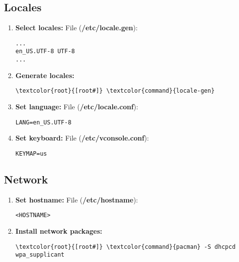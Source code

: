 \documentclass[10pt, a4paper, onecolumn, openany]{book} %
\begin{document}
\subsection{Locales}
    \begin{enumerate}
        \item \textbf{Select locales:}
\newline File (\textbf{\textcolor{file}{/etc/locale.gen}}):
\begin{Verbatim}[commandchars=\\\{\}]
...
en_US.UTF-8 UTF-8
...
\end{Verbatim}
        \item \textbf{Generate locales:}
\begin{Verbatim}[commandchars=\\\{\}]
\textcolor{root}{[root#]} \textcolor{command}{locale-gen}
\end{Verbatim}      
        \item \textbf{Set language:}
\newline File (\textbf{\textcolor{file}{/etc/locale.conf}}):
\begin{Verbatim}[commandchars=\\\{\}]
LANG=en_US.UTF-8
\end{Verbatim}
        \item \textbf{Set keyboard:}
\newline File (\textbf{\textcolor{file}{/etc/vconsole.conf}}):
\begin{Verbatim}[commandchars=\\\{\}]
KEYMAP=us
\end{Verbatim}
        \end{enumerate}
\subsection{Network}
        \begin{enumerate}
            \item \textbf{Set hostname:}
\newline File (\textbf{\textcolor{file}{/etc/hostname}}):
\begin{Verbatim}[commandchars=\\\{\}]
<HOSTNAME>
\end{Verbatim}
            \item \textbf{Install network packages:}
\begin{Verbatim}[commandchars=\\\{\}]
\textcolor{root}{[root#]} \textcolor{command}{pacman} -S dhcpcd wpa_supplicant
\end{Verbatim}   
    \end{enumerate}
\end{document}
